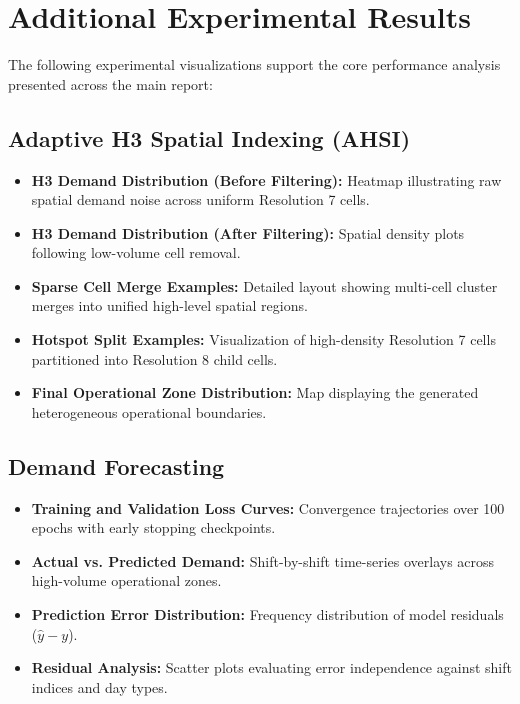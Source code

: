 \documentclass{article}
\begin{document}
\newpage
\section{Additional Experimental Results}
\label{app:additional_experimental_results}

The following experimental visualizations support the core performance analysis presented across the main report:

\subsection{Adaptive H3 Spatial Indexing (AHSI)}
\begin{itemize}
    \item \textbf{H3 Demand Distribution (Before Filtering):} Heatmap illustrating raw spatial demand noise across uniform Resolution 7 cells.
    \item \textbf{H3 Demand Distribution (After Filtering):} Spatial density plots following low-volume cell removal.
    \item \textbf{Sparse Cell Merge Examples:} Detailed layout showing multi-cell cluster merges into unified high-level spatial regions.
    \item \textbf{Hotspot Split Examples:} Visualization of high-density Resolution 7 cells partitioned into Resolution 8 child cells.
    \item \textbf{Final Operational Zone Distribution:} Map displaying the generated heterogeneous operational boundaries.
\end{itemize}

\subsection{Demand Forecasting}
\begin{itemize}
    \item \textbf{Training and Validation Loss Curves:} Convergence trajectories over 100 epochs with early stopping checkpoints.
    \item \textbf{Actual vs. Predicted Demand:} Shift-by-shift time-series overlays across high-volume operational zones.
    \item \textbf{Prediction Error Distribution:} Frequency distribution of model residuals ($\hat{y} - y$).
    \item \textbf{Residual Analysis:} Scatter plots evaluating error independence against shift indices and day types.
\end{itemize}
\end{document}
